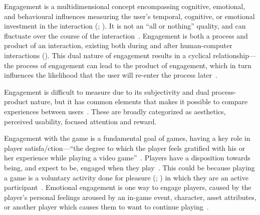 Engagement is a multidimensional concept encompassing cognitive, emotional, and
behavioural influences measuring the user's temporal, cognitive, or emotional
investment in the interaction (;
). It is not an ``all or nothing'' quality, and
can fluctuate over the course of the
interaction~\citep[p.~19]{o2016theoretical}. Engagement is both a process and
product of an interaction, existing both during and after human-computer
interactions (). This dual nature of engagement
results in a cyclical relationship---the process of engagement can lead to the
product of engagement, which in turn influences the likelihood that the user
will re-enter the process later~\citep[p.~945]{o2008user}.

Engagement is difficult to measure due to its subjectivity and dual
process-product nature, but it has common elements that makes it possible to
compare experiences between users~\citep[p.~41]{calvillo2015assessing}. These
are broadly categorized as aesthetics, perceived usability, focused attention
and reward.

Engagement with the game is a fundamental goal of games, having a key role
in player satisfa\-/ction---``the degree to which the player feels gratified
with his or her experience while playing a video
game''~\citep[p.~1220]{phan2016development}. Players have a disposition towards
being, and expect to be, engaged when they
play~\citep[p.~84]{cairns2016engagement}. This could be because playing a game
is a voluntary activity done for pleasure (;
) in which they are an active
participant~\citep[p.~94]{mayra2007fundamental}. Emotional engagement is one
way to engage players, caused by the player's personal feelings aroused by an
in-game event, character, asset attributes, or another player which causes them
to want to continue playing~\citep[p.~406--407]{schonau2012sure}.

